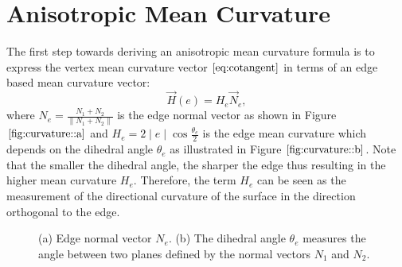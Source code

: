 \documentclass[11pt]{article}
\begin{document}
\section{Anisotropic Mean Curvature}

The first step towards deriving an anisotropic mean curvature formula is to express the vertex mean curvature vector $\ref{eq:cotangent}$ in terms of an edge based mean curvature vector:
\begin{equation}
  \vec{H}(e) = H_e \vec{N}_e,
  \label{eq:edgeMC}
\end{equation}
where $N_e = \frac{N_1 + N_2}{\parallel N_1 + N_2 \parallel}$ is the edge normal vector as shown in Figure $\ref{fig:curvature::a}$ and $H_e = 2\mid e \mid \cos \frac{\theta_e}{2}$ is the edge mean curvature which depends on the dihedral angle $\theta_e$ as illustrated in Figure $\ref{fig:curvature::b}$. Note that the smaller the dihedral angle, the sharper the edge thus resulting in the higher mean curvature $H_e$. Therefore, the term $H_e$ can be seen as the measurement of the directional curvature of the surface in the direction orthogonal to the edge.

\begin{figure}[htbp]
	\centering
	\caption{(a) Edge normal vector $N_e$. (b) The dihedral angle $\theta_e$ measures the angle between two planes defined by the normal vectors $N_1$ and $N_2$.}
	\label{fig:curvature}
\end{figure}
\end{document}
